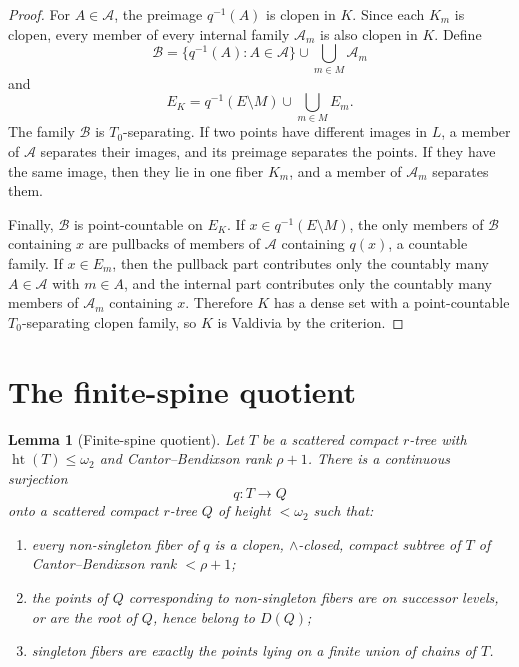 \documentclass[11pt]{article}
\newtheorem{lemma}{Lemma}
\newcommand{\htte}{\operatorname{ht}}
\begin{document}
\begin{proof}
For \(A\in\mathcal A\), the preimage \(q^{-1}(A)\) is clopen in \(K\).  Since
each \(K_m\) is clopen, every member of every internal family
\(\mathcal A_m\) is also clopen in \(K\).  Define
\[
\mathcal B=\{q^{-1}(A):A\in\mathcal A\}
       \cup \bigcup_{m\in M}\mathcal A_m
\]
and
\[
E_K=q^{-1}(E\setminus M)\cup\bigcup_{m\in M}E_m.
\]
The family \(\mathcal B\) is \(T_0\)-separating.  If two points have different
images in \(L\), a member of \(\mathcal A\) separates their images, and its
preimage separates the points.  If they have the same image, then they lie in
one fiber \(K_m\), and a member of \(\mathcal A_m\) separates them.

Finally, \(\mathcal B\) is point-countable on \(E_K\).  If
\(x\in q^{-1}(E\setminus M)\), the only members of \(\mathcal B\) containing
\(x\) are pullbacks of members of \(\mathcal A\) containing \(q(x)\), a
countable family.  If \(x\in E_m\), then the pullback part contributes only
the countably many \(A\in\mathcal A\) with \(m\in A\), and the internal part
contributes only the countably many members of \(\mathcal A_m\) containing
\(x\).  Therefore \(K\) has a dense set with a point-countable
\(T_0\)-separating clopen family, so \(K\) is Valdivia by the criterion.
\end{proof}

\section*{The finite-spine quotient}

\begin{lemma}[Finite-spine quotient]\label{lem:quotient}
Let \(T\) be a scattered compact \(r\)-tree with \(\htte(T)\leq\omega_2\) and
Cantor--Bendixson rank \(\rho+1\).  There is a continuous surjection
\[
q:T\longrightarrow Q
\]
onto a scattered compact \(r\)-tree \(Q\) of height \(<\omega_2\) such that:
\begin{enumerate}
\item every non-singleton fiber of \(q\) is a clopen, \(\wedge\)-closed,
compact subtree of \(T\) of Cantor--Bendixson rank \(<\rho+1\);
\item the points of \(Q\) corresponding to non-singleton fibers are on
successor levels, or are the root of \(Q\), hence belong to \(D(Q)\);
\item singleton fibers are exactly the points lying on a finite union of
chains of \(T\).
\end{enumerate}
\end{lemma}
\end{document}
